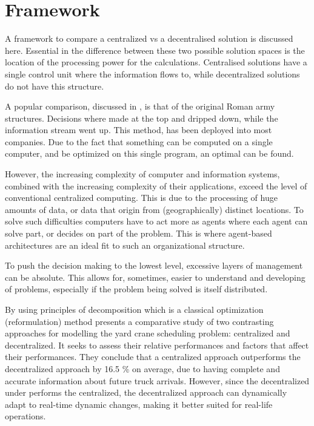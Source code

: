 
\newpage
\section{Framework}
A framework to compare a centralized vs a decentralised solution is discussed here. Essential in the difference between these two possible solution spaces is the location of the processing power for the calculations. Centralised solutions have a single control unit where the information flows to, while decentralized solutions do not have this structure.

A popular comparison, discussed in \citet{parunak1999industrial}, is that of the original Roman army structures. Decisions where made at the top and dripped down, while the information stream went up. This method, has been deployed into most companies. Due to the fact that something can be computed on a single computer, and be optimized on this single program, an optimal can be found.

However, the increasing complexity of computer and information systems, combined with the increasing complexity of their applications, exceed the level of conventional centralized computing. This is due to the processing of huge amounts of data, or data that origin from (geographically) distinct locations. To solve such difficulties computers have to act more as agents where each agent can solve part, or decides on part of the problem. This is where agent-based architectures are an ideal fit to such an organizational structure.

To push the decision making to the lowest level, excessive layers of management can be absolute. This allows for, sometimes, easier to understand and developing of problems, especially if the problem being solved is itself distributed.

By using principles of decomposition which is a classical optimization (reformulation) method \citet{sharif2012yard} presents a comparative study of two contrasting approaches for modelling the yard crane scheduling problem: centralized and decentralized. It seeks to assess their relative performances and factors that affect their performances. They conclude that a centralized approach outperforms the decentralized approach by 16.5 \% on average, due to having complete and accurate information about future truck arrivals. However, since the decentralized under performs the centralized, the decentralized approach can dynamically adapt to real-time dynamic changes, making it better suited for real-life operations. 

